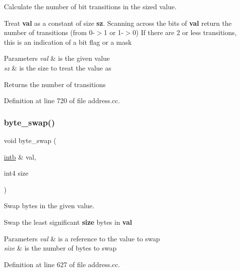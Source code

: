 Calculate the number of bit transitions in the sized value. 

Treat {\bfseries{val}} as a constant of size {\bfseries{sz}}. Scanning across the bits of {\bfseries{val}} return the number of transitions (from 0-\/$>$1 or 1-\/$>$0) If there are 2 or less transitions, this is an indication of a bit flag or a mask 
\begin{DoxyParams}{Parameters}
{\em val} & is the given value \\
\hline
{\em sz} & is the size to treat the value as \\
\hline
\end{DoxyParams}
\begin{DoxyReturn}{Returns}
the number of transitions 
\end{DoxyReturn}


Definition at line 720 of file address.\+cc.

\mbox{\label{address_8hh_aedcacdf1dd5af3b58d59d76b8011d0f1}} 
\subsubsection{\texorpdfstring{byte\_swap()}{byte\_swap()}\hspace{0.1cm}{\footnotesize\ttfamily [1/2]}}
{\footnotesize\ttfamily void byte\+\_\+swap (\begin{DoxyParamCaption}\item[{\mbox{\hyperlink{types_8h_aa925ba3e627c2df89d5b1cfe84fb8572}{intb}} \&}]{val,  }\item[{int4}]{size }\end{DoxyParamCaption})}



Swap bytes in the given value. 

Swap the least significant {\bfseries{size}} bytes in {\bfseries{val}} 
\begin{DoxyParams}{Parameters}
{\em val} & is a reference to the value to swap \\
\hline
{\em size} & is the number of bytes to swap \\
\hline
\end{DoxyParams}


Definition at line 627 of file address.\+cc.

\mbox{\label{address_8hh_ad080ab6270827c2a718582d0345d93a4}} 
